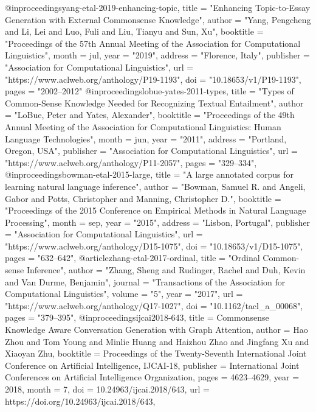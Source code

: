 @inproceedings{yang-etal-2019-enhancing-topic,
    title = "Enhancing Topic-to-Essay Generation with External Commonsense Knowledge",
    author = "Yang, Pengcheng  and
      Li, Lei  and
      Luo, Fuli  and
      Liu, Tianyu  and
      Sun, Xu",
    booktitle = "Proceedings of the 57th Annual Meeting of the Association for Computational Linguistics",
    month = jul,
    year = "2019",
    address = "Florence, Italy",
    publisher = "Association for Computational Linguistics",
    url = "https://www.aclweb.org/anthology/P19-1193",
    doi = "10.18653/v1/P19-1193",
    pages = "2002--2012"
}
@inproceedings{lobue-yates-2011-types,
    title = "Types of Common-Sense Knowledge Needed for Recognizing Textual Entailment",
    author = "LoBue, Peter  and
      Yates, Alexander",
    booktitle = "Proceedings of the 49th Annual Meeting of the Association for Computational Linguistics: Human Language Technologies",
    month = jun,
    year = "2011",
    address = "Portland, Oregon, USA",
    publisher = "Association for Computational Linguistics",
    url = "https://www.aclweb.org/anthology/P11-2057",
    pages = "329--334",
}
@inproceedings{bowman-etal-2015-large,
    title = "A large annotated corpus for learning natural language inference",
    author = "Bowman, Samuel R.  and
      Angeli, Gabor  and
      Potts, Christopher  and
      Manning, Christopher D.",
    booktitle = "Proceedings of the 2015 Conference on Empirical Methods in Natural Language Processing",
    month = sep,
    year = "2015",
    address = "Lisbon, Portugal",
    publisher = "Association for Computational Linguistics",
    url = "https://www.aclweb.org/anthology/D15-1075",
    doi = "10.18653/v1/D15-1075",
    pages = "632--642",
}
@article{zhang-etal-2017-ordinal,
    title = "Ordinal Common-sense Inference",
    author = "Zhang, Sheng  and
      Rudinger, Rachel  and
      Duh, Kevin  and
      Van Durme, Benjamin",
    journal = "Transactions of the Association for Computational Linguistics",
    volume = "5",
    year = "2017",
    url = "https://www.aclweb.org/anthology/Q17-1027",
    doi = "10.1162/tacl_a_00068",
    pages = "379--395",
}
@inproceedings{ijcai2018-643,
  title     = {Commonsense Knowledge Aware Conversation Generation with Graph Attention},
  author    = {Hao Zhou and Tom Young and Minlie Huang and Haizhou Zhao and Jingfang Xu and Xiaoyan Zhu},
  booktitle = {Proceedings of the Twenty-Seventh International Joint Conference on
               Artificial Intelligence, {IJCAI-18}},
  publisher = {International Joint Conferences on Artificial Intelligence Organization},             
  pages     = {4623--4629},
  year      = {2018},
  month     = {7},
  doi       = {10.24963/ijcai.2018/643},
  url       = {https://doi.org/10.24963/ijcai.2018/643},
}
